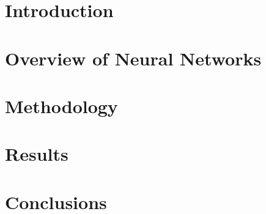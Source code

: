 \documentclass{thesis}
\begin{document}
\maketitle





\thesisTables
\thesisBodyStart

\chapter{Introduction}


\chapter{Overview of Neural Networks}


\chapter{Methodology}


\chapter{Results}


\chapter{Conclusions}


\printReferences
\thesisTOT
\thesisTOF
\end{document}
